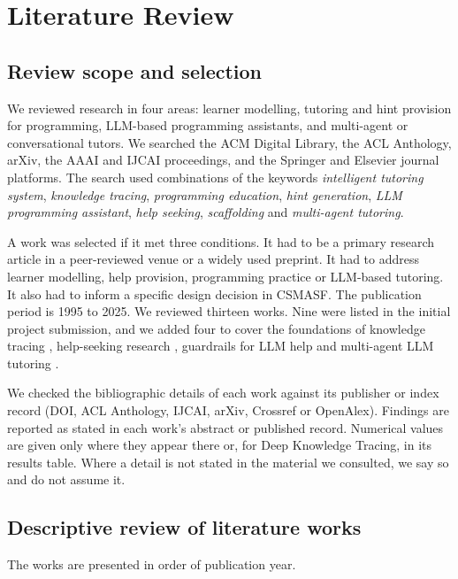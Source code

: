 \chapter{Literature Review}
\section{Review scope and selection}
We reviewed research in four areas: learner modelling, tutoring and hint provision for programming, LLM-based programming assistants, and multi-agent or conversational tutors. We searched the ACM Digital Library, the ACL Anthology, arXiv, the AAAI and IJCAI proceedings, and the Springer and Elsevier journal platforms. The search used combinations of the keywords \emph{intelligent tutoring system}, \emph{knowledge tracing}, \emph{programming education}, \emph{hint generation}, \emph{LLM programming assistant}, \emph{help seeking}, \emph{scaffolding} and \emph{multi-agent tutoring}.

A work was selected if it met three conditions. It had to be a primary research article in a peer-reviewed venue or a widely used preprint. It had to address learner modelling, help provision, programming practice or LLM-based tutoring. It also had to inform a specific design decision in CSMASF. The publication period is 1995 to 2025. We reviewed thirteen works. Nine were listed in the initial project submission, and we added four to cover the foundations of knowledge tracing \cite{corbett1995}, help-seeking research \cite{aleven2016}, guardrails for LLM help \cite{liffiton2023} and multi-agent LLM tutoring \cite{schmucker2024}.

We checked the bibliographic details of each work against its publisher or index record (DOI, ACL Anthology, IJCAI, arXiv, Crossref or OpenAlex). Findings are reported as stated in each work's abstract or published record. Numerical values are given only where they appear there or, for Deep Knowledge Tracing, in its results table. Where a detail is not stated in the material we consulted, we say so and do not assume it.

\section{Descriptive review of literature works}
The works are presented in order of publication year.

\clearpage
